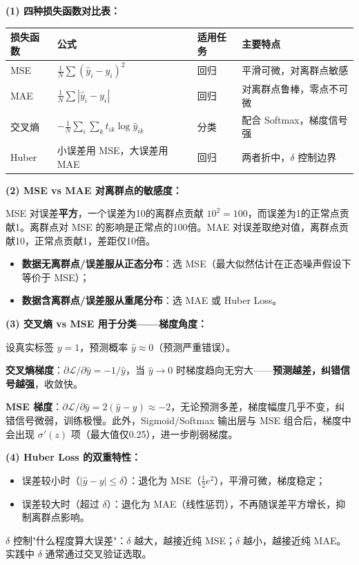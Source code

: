 \documentclass[a4paper,11pt]{ctexart}
\begin{document}
\begin{solutionbox}[参考答案与详细解析]
    \textbf{(1) 四种损失函数对比表：}

    \begin{center}
    \begin{tabular}{p{2.2cm} p{4.5cm} p{2.2cm} p{2.8cm}}
        \toprule
        损失函数 & 公式 & 适用任务 & 主要特点 \\
        \midrule
        MSE & $\frac{1}{N}\sum(\hat{y}_i-y_i)^2$ & 回归 & 平滑可微，对离群点敏感 \\[0.8em]
        MAE & $\frac{1}{N}\sum|\hat{y}_i-y_i|$ & 回归 & 对离群点鲁棒，零点不可微 \\[0.8em]
        交叉熵 & $-\frac{1}{N}\sum_i\sum_k t_{ik}\log\hat{y}_{ik}$ & 分类 & 配合 Softmax，梯度信号强 \\[0.8em]
        Huber & 小误差用 MSE，大误差用 MAE & 回归 & 两者折中，$\delta$ 控制边界 \\
        \bottomrule
    \end{tabular}
    \end{center}

    \textbf{(2) MSE vs MAE 对离群点的敏感度：}

    MSE 对误差\textbf{平方}，一个误差为10的离群点贡献 $10^2=100$，而误差为1的正常点贡献1。离群点对 MSE 的影响是正常点的100倍。MAE 对误差取绝对值，离群点贡献10，正常点贡献1，差距仅10倍。

    \begin{itemize}
        \item \textbf{数据无离群点/误差服从正态分布}：选 MSE（最大似然估计在正态噪声假设下等价于 MSE）；
        \item \textbf{数据含离群点/误差服从重尾分布}：选 MAE 或 Huber Loss。
    \end{itemize}

    \textbf{(3) 交叉熵 vs MSE 用于分类——梯度角度：}

    设真实标签 $y=1$，预测概率 $\hat{y} \approx 0$（预测严重错误）。

    \textbf{交叉熵梯度}：$\partial \mathcal{L}/\partial \hat{y} = -1/\hat{y}$，当 $\hat{y} \to 0$ 时梯度趋向无穷大——\textbf{预测越差，纠错信号越强}，收敛快。

    \textbf{MSE 梯度}：$\partial \mathcal{L}/\partial \hat{y} = 2(\hat{y}-y) \approx -2$，无论预测多差，梯度幅度几乎不变，纠错信号微弱，训练极慢。此外，Sigmoid/Softmax 输出层与 MSE 组合后，梯度中会出现 $\sigma'(z)$ 项（最大值仅0.25），进一步削弱梯度。

    \textbf{(4) Huber Loss 的双重特性：}

    \begin{itemize}
        \item 误差较小时（$|\hat{y}-y| \leq \delta$）：退化为 MSE（$\frac{1}{2}e^2$），平滑可微，梯度稳定；
        \item 误差较大时（超过 $\delta$）：退化为 MAE（线性惩罚），不再随误差平方增长，抑制离群点影响。
    \end{itemize}

    $\delta$ 控制"什么程度算大误差"：$\delta$ 越大，越接近纯 MSE；$\delta$ 越小，越接近纯 MAE。实践中 $\delta$ 通常通过交叉验证选取。
\end{solutionbox}
\end{document}
